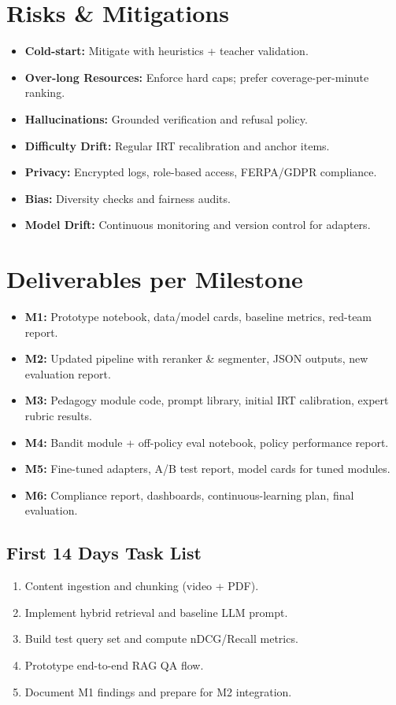 \documentclass[12pt]{article}
\begin{document}
\section{Risks \& Mitigations}
\begin{itemize}[leftmargin=1.2cm]
  \item \textbf{Cold-start:} Mitigate with heuristics + teacher validation.
  \item \textbf{Over-long Resources:} Enforce hard caps; prefer coverage-per-minute ranking.
  \item \textbf{Hallucinations:} Grounded verification and refusal policy.
  \item \textbf{Difficulty Drift:} Regular IRT recalibration and anchor items.
  \item \textbf{Privacy:} Encrypted logs, role-based access, FERPA/GDPR compliance.
  \item \textbf{Bias:} Diversity checks and fairness audits.
  \item \textbf{Model Drift:} Continuous monitoring and version control for adapters.
\end{itemize}

\section{Deliverables per Milestone}
\begin{itemize}[leftmargin=1.2cm]
  \item \textbf{M1:} Prototype notebook, data/model cards, baseline metrics, red-team report.
  \item \textbf{M2:} Updated pipeline with reranker \& segmenter, JSON outputs, new evaluation report.
  \item \textbf{M3:} Pedagogy module code, prompt library, initial IRT calibration, expert rubric results.
  \item \textbf{M4:} Bandit module + off-policy eval notebook, policy performance report.
  \item \textbf{M5:} Fine-tuned adapters, A/B test report, model cards for tuned modules.
  \item \textbf{M6:} Compliance report, dashboards, continuous-learning plan, final evaluation.
\end{itemize}

\subsection*{First 14 Days Task List}
\begin{enumerate}[leftmargin=1.2cm]
  \item Content ingestion and chunking (video + PDF).
  \item Implement hybrid retrieval and baseline LLM prompt.
  \item Build test query set and compute nDCG/Recall metrics.
  \item Prototype end-to-end RAG QA flow.
  \item Document M1 findings and prepare for M2 integration.
\end{enumerate}
\end{document}
